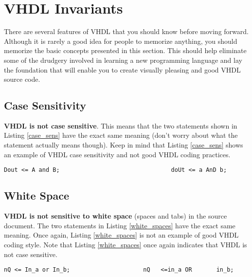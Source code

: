 %
%
%
\chapter{VHDL Invariants}
There are several features of VHDL that you should know before moving forward. Although it is rarely a good idea for people to memorize anything, you should memorize the basic concepts presented in this section. This should help eliminate some of the drudgery involved in learning a new programming language and lay the foundation that will enable you to create visually pleasing and good VHDL source code.

\section{Case Sensitivity}
\textbf{VHDL is not case sensitive}. This means that the two statements shown in Listing \ref{case_sens} have the exact same meaning (don't worry about what the statement actually means though). Keep in mind that Listing \ref{case_sens} shows an example of VHDL case sensitivity and not good VHDL coding practices.
\begin{lstlisting}[label=case_sens, caption=An example of VHDL case insensitivity.]
Dout <= A and B;								doUt <= a AnD b;
\end{lstlisting}
\section{White Space}
\textbf{VHDL is not sensitive to white space} (spaces and tabs) in the source document. The two statements in Listing \ref{white_spaces} have the exact same meaning. Once again, Listing \ref{white_spaces} is not an example of good VHDL coding style. Note that Listing \ref{white_spaces} once again indicates that VHDL is not case sensitive.
\begin{lstlisting}[label=white_spaces, caption=An example showing VHDL's indifference to white space.]
nQ <= In_a or In_b;						nQ   <=in_a OR       in_b;
\end{lstlisting}

